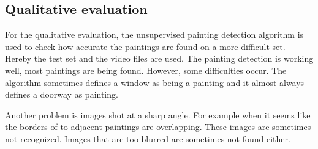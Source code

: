 \subsection{Qualitative evaluation}
For the qualitative evaluation, the unsupervised painting detection algorithm is used to check how accurate the paintings are found on a more difficult set. Hereby the test set and the video files are used. The painting detection is working well, most paintings are being found. However, some difficulties occur. The algorithm sometimes defines a window as being a painting and it almost always defines a doorway as painting.

Another problem is images shot at a sharp angle. For example when it seems like the borders of to adjacent paintings are overlapping. These images are sometimes not recognized. Images that are too blurred are sometimes not found either.
